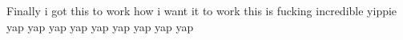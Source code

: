 \documentclass{article}
\begin{document}
\begin{flushleft}
Finally i got this to work how i want it to work this is fucking incredible yippie yap yap yap yap yap yap yap yap yap
\end{flushleft}
\end{document}
